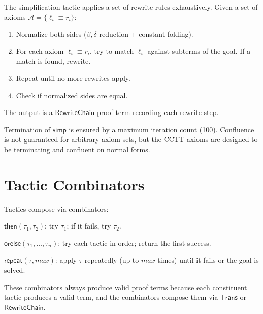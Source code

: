 The simplification tactic applies a set of rewrite rules exhaustively.
Given a set of axioms $\mathcal{A} = \{\ell_i \equiv r_i\}$:

\begin{enumerate}
\item Normalize both sides ($\beta, \delta$ reduction + constant folding).
\item For each axiom $\ell_i \equiv r_i$, try to match $\ell_i$ against
  subterms of the goal.  If a match is found, rewrite.
\item Repeat until no more rewrites apply.
\item Check if normalized sides are equal.
\end{enumerate}

The output is a $\mathsf{RewriteChain}$ proof term recording each
rewrite step.

\begin{remark}
Termination of $\mathsf{simp}$ is ensured by a maximum iteration
count (100).  Confluence is not guaranteed for arbitrary axiom sets,
but the CCTT axioms are designed to be terminating and confluent
on normal forms.
\end{remark}


\section{Tactic Combinators}

Tactics compose via combinators:

\begin{definition}[Sequencing]
$\mathsf{then}(\tau_1, \tau_2)$: try $\tau_1$; if it fails, try $\tau_2$.
\end{definition}

\begin{definition}[Alternative]
$\mathsf{orelse}(\tau_1, \ldots, \tau_n)$: try each tactic in order;
return the first success.
\end{definition}

\begin{definition}[Repetition]
$\mathsf{repeat}(\tau, \mathit{max})$: apply $\tau$ repeatedly (up to
$\mathit{max}$ times) until it fails or the goal is solved.
\end{definition}

These combinators always produce valid proof terms because each
constituent tactic produces a valid term, and the combinators compose
them via $\mathsf{Trans}$ or $\mathsf{RewriteChain}$.


